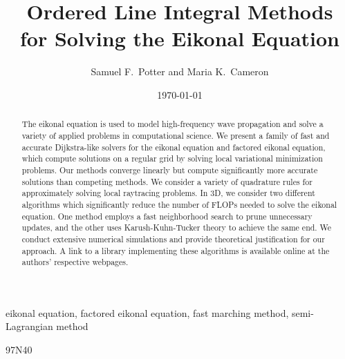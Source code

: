 \documentclass[eikonal.tex]{subfiles}
\begin{document}
\title{Ordered Line Integral Methods \\ for Solving the Eikonal Equation}
\author{Samuel F.\ Potter and Maria K.\ Cameron}
\date{\today}

\maketitle

\begin{abstract}
  The eikonal equation is used to model high-frequency wave
  propagation and solve a variety of applied problems in computational
  science. We present a family of fast and accurate Dijkstra-like
  solvers for the eikonal equation and factored eikonal equation,
  which compute solutions on a regular grid by solving local
  variational minimization problems. Our methods converge linearly but
  compute significantly more accurate solutions than competing
  methods. We consider a variety of quadrature rules for approximately
  solving local raytracing problems. In 3D, we consider two different
  algorithms which significantly reduce the number of FLOPs needed to
  solve the eikonal equation. One method employs a fast neighborhood
  search to prune unnecessary updates, and the other uses
  Karush-Kuhn-Tucker theory to achieve the same end. We conduct
  extensive numerical simulations and provide theoretical
  justification for our approach. A link to a library implementing
  these algorithms is available online at the authors' respective
  webpages.
\end{abstract}

\begin{keywords}
  eikonal equation, factored eikonal equation, fast marching method,
  semi-Lagrangian method
\end{keywords}

\begin{AMS}
  97N40
\end{AMS}
\end{document}
